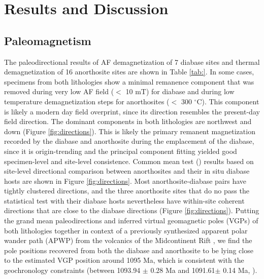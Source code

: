 \documentclass[draft]{agujournal2019}
\begin{document}
\section*{Results and Discussion}
\subsection*{Paleomagnetism}
The paleodirectional results of AF demagnetization of 7 diabase sites and thermal demagnetization of 16 anorthosite sites are shown in Table \ref{tab:}. In some cases, specimens from both lithologies show a minimal remanence component that was removed during very low AF field ($<$ 10 mT) for diabase and during low temperature demagnetization steps for anorthosites ($<$ 300 $^\circ$C). This component is likely a modern day field overprint, since its direction resembles the present-day field direction. The dominant components in both lithologies are northwest and down (Figure \ref{fig:directions}). This is likely the primary remanent magnetization recorded by the diabase and anorthosite during the emplacement of the diabase, since it is origin-trending and the principal component fitting yielded good specimen-level and site-level consistence. Common mean test (\cite{McFadden1990a}) results based on site-level directional comparison between anorthosites and their in situ diabase hosts are shown in Figure \ref{fig:directions}. Most anorthosite-diabase pairs have tightly clustered directions, and the three anorthosite sites that do no pass the statistical test with their diabase hosts nevertheless have within-site coherent directions that are close to the diabase directions (Figure \ref{fig:directions}). Putting the grand mean paleodirections and inferred virtual geomagnetic poles (VGPs) of both lithologies together in context of a previously synthesized apparent polar wander path (APWP) from the volcanics of the Midcontinent Rift \cite{Swanson-Hysell2019a}, we find the pole positions recovered from both the diabase and anorthosite to be lying close to the estimated VGP position around 1095 Ma, which is consistent with the geochronology constraints (between 1093.94 $\pm$ 0.28 Ma and 1091.61$\pm$ 0.14 Ma, \cite{Swanson-Hysell2019a}). 
\end{document}
